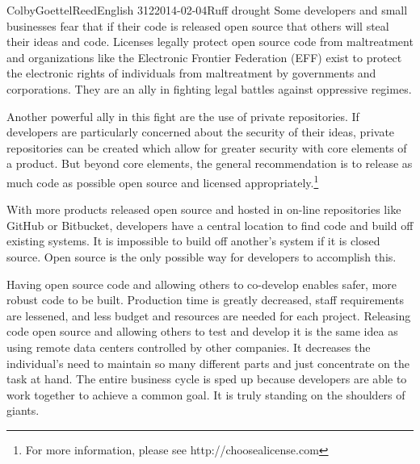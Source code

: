 \documentclass[12pt]{article}
\begin{document}
\begin{mla}{Colby}{Goettel}{Reed}{English 312}{2014-02-04}{Ruff drought}
Some developers and small businesses fear that if their code is released open source that others will steal their ideas and code. Licenses legally protect open source code from maltreatment and organizations like the Electronic Frontier Federation (EFF) exist to protect the electronic rights of individuals from maltreatment by governments and corporations. They are an ally in fighting legal battles against oppressive regimes.

Another powerful ally in this fight are the use of private repositories. If developers are particularly concerned about the security of their ideas, private repositories can be created which allow for greater security with core elements of a product. But beyond core elements, the general recommendation is to release as much code as possible open source and licensed appropriately.\footnote{For more information, please see http://choosealicense.com}

With more products released open source and hosted in on-line repositories like GitHub or Bitbucket, developers have a central location to find code and build off existing systems. It is impossible to build off another's system if it is closed source. Open source is the only possible way for developers to accomplish this.

Having open source code and allowing others to co-develop enables safer, more robust code to be built. Production time is greatly decreased, staff requirements are lessened, and less budget and resources are needed for each project. Releasing code open source and allowing others to test and develop it is the same idea as using remote data centers controlled by other companies. It decreases the individual's need to maintain so many different parts and just concentrate on the task at hand. The entire business cycle is sped up because developers are able to work together to achieve a common goal. It is truly standing on the shoulders of giants.

\end{mla}
\end{document}
